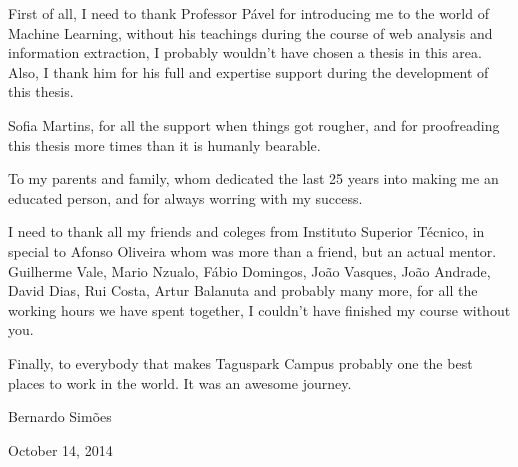\begin{acknowledgments}
  First of all, I need to thank Professor Pável for introducing me to the world of Machine Learning, without his teachings during the course of web analysis and information extraction, I probably wouldn't have chosen a thesis in this area. Also, I thank him for his full and expertise support during the development of this thesis. 

  Sofia Martins, for all the support when things got rougher, and for proofreading this thesis more times than it is humanly bearable.

  To my parents and family, whom dedicated the last 25 years into making me an educated person, and for always worring with my success.

  I need to thank all my friends and coleges from Instituto Superior Técnico, in special to Afonso Oliveira whom was more than a friend, but an actual mentor. Guilherme Vale, Mario Nzualo, Fábio Domingos, João Vasques, João Andrade, David Dias, Rui Costa, Artur Balanuta and probably many more, for all the working hours we have spent together, I couldn't have finished my course without you.

  Finally, to everybody that makes Taguspark Campus probably one the best places to work in the world. It was an awesome journey.

\hfill Bernardo Simões
 
\hfill October 14, 2014
\end{acknowledgments}
 
